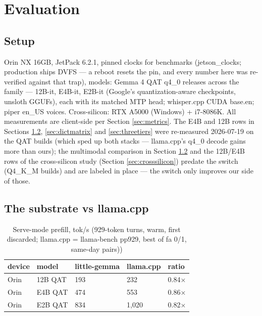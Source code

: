 \documentclass{article}
\begin{document}
\section{Evaluation}
\label{sec:eval}

\subsection{Setup}

Orin NX 16GB, JetPack 6.2.1, pinned clocks for benchmarks (jetson\_clocks; production ships DVFS --- a reboot resets the pin, and every number here was re-verified against that trap), models: Gemma 4 QAT q4\_0 releases across the family --- 12B-it, E4B-it, E2B-it (Google's quantization-aware checkpoints, unsloth GGUFs), each with its matched MTP head; whisper.cpp CUDA base.en; piper en\_US voices. Cross-silicon: RTX A5000 (Windows) + i7-8086K. All measurements are client-side per Section \ref{sec:metrics}. The E4B and 12B rows in Sections \ref{sec:substrate-eval}, \ref{sec:dictmatrix} and \ref{sec:threetiers} were re-measured 2026-07-19 on the QAT builds (which sped up both stacks --- llama.cpp's q4\_0 decode gains more than ours); the multimodal comparison in Section \ref{sec:substrate-eval} and the 12B/E4B rows of the cross-silicon study (Section \ref{sec:crosssilicon}) predate the switch (Q4\_K\_M builds) and are labeled in place --- the switch only improves our side of those.


\subsection{The substrate vs llama.cpp}
\label{sec:substrate-eval}

\begin{table}[H]
	\centering
	\begin{tabularx}{\textwidth}{l X X X X}
		\toprule
		device & model  & little-gemma  & llama.cpp & ratio \\
		\midrule
		Orin & 12B QAT & 193 & 232 & 0.84×\\
		Orin & E4B QAT & 474 & 553 & 0.86×\\
		Orin & E2B QAT & 834 & 1,020 & 0.82×\\
		\bottomrule
	\end{tabularx}
	\caption{Serve-mode prefill, tok/s (929-token turns, warm, first discarded; llama.cpp = llama-bench pp929, best of fa 0/1, same-day pairs))}
	\label{tab:serve-mode-prefill}
\end{table}
\end{document}
